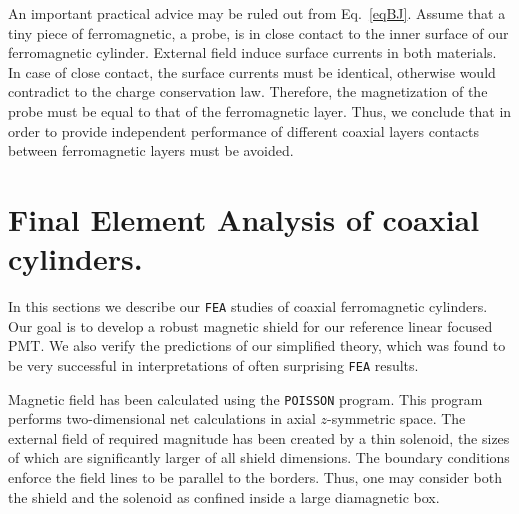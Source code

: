 \documentclass[12pt]{article}
\begin{document}
An important practical advice may be ruled out   from   Eq.~\ref{eqBJ}.
Assume  that  a  tiny piece of ferromagnetic, a probe, is in close contact to the inner
surface of our  ferromagnetic cylinder.  External field induce 
surface currents in both materials.
In  case of close contact,   the  surface currents must  be  identical, 
otherwise   would  contradict  to the charge  conservation law. 
Therefore,  the  magnetization of the probe must  be  equal to that of the  
ferromagnetic layer.
Thus, we  conclude  that  in order to provide  independent performance of 
different coaxial layers  contacts between  
ferromagnetic layers must  be avoided.
\section{Final Element Analysis of coaxial cylinders.}
\label{sec:fea}
In this   sections we describe our  {\tt FEA} studies of coaxial ferromagnetic cylinders.
Our goal is to develop a  robust magnetic shield for our reference linear focused PMT. 
We also  verify the predictions of our simplified theory, 
which was   found to be very successful in  interpretations of often  
surprising {\tt FEA} results.

Magnetic field has been calculated 
using the {\tt POISSON}  program.  This program performs two-dimensional 
net calculations in axial $z$-symmetric  space.
The external field  of required  magnitude  
has been created by  a thin   solenoid,
the sizes of which are   significantly larger of all shield dimensions.
The boundary conditions enforce  the field lines 
to be parallel to the borders.
Thus, one may  consider  both the  shield and the  solenoid as 
confined inside  a  large diamagnetic box.
\end{document}
